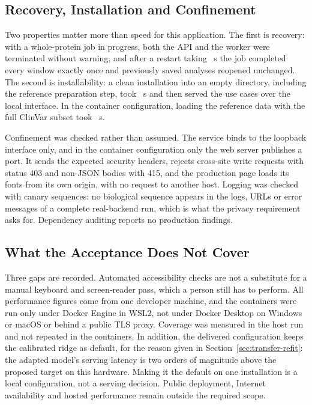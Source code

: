 \subsection{Recovery, Installation and Confinement}
Two properties matter more than speed for this application. The first is recovery: with a
whole-protein job in progress, both the API and the worker were terminated without warning, and
after a restart taking \nAppRestartSeconds{}~s the job completed every window exactly once and
previously saved analyses reopened unchanged. The second is installability: a clean installation into
an empty directory, including the reference preparation step, took \nAppInstallSeconds{}~s and then
served the use cases over the local interface. In the container configuration, loading the reference
data with the full ClinVar subset took \nAppEtlSeconds{}~s.

Confinement was checked rather than assumed. The service binds to the loopback interface only, and
in the container configuration only the web server publishes a port. It sends the expected security
headers, rejects cross-site write requests with status 403 and non-JSON bodies with 415, and the
production page loads its fonts from its own origin, with no request to another host. Logging was checked with canary sequences: no biological sequence appears in the logs, URLs or
error messages of a complete real-backend run, which is what the privacy requirement asks for.
Dependency auditing reports no production findings.

\subsection{What the Acceptance Does Not Cover}
Three gaps are recorded. Automated accessibility checks are not a substitute for a manual keyboard
and screen-reader pass, which a person still has to perform. All performance figures come from one
developer machine, and the containers were run only under Docker Engine in WSL2, not under Docker
Desktop on Windows or macOS or behind a public TLS proxy. Coverage was measured in the host run and
not repeated in the containers. In addition, the delivered configuration keeps the calibrated ridge
as default, for the reason given in Section~\ref{sec:transfer-refit}: the adapted model's serving
latency is two orders of magnitude above the proposed target on this hardware. Making it the default
on one installation is a local configuration, not a serving decision. Public deployment, Internet
availability and hosted performance remain outside the required scope.
